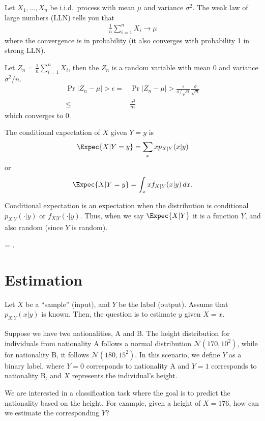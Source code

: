 \documentclass{article}
\begin{document}
\begin{remark}
    Let $X_1, \dots, X_n$ be i.i.d.~process with mean $\mu$ and variance $\sigma^2$.
    The weak law of large numbers (LLN) tells you that
    \begin{align}
        \frac{1}{n}\sum_{i=1}^n X_i \rightarrow \mu
    \end{align}
    where the convergence is in probability (it also converges with probability 1 in strong LLN).

    Let $Z_n = \frac{1}{n}\sum_{i=1}^n X_i$, then the $Z_n$ is a random variable with mean $0$ and variance $\sigma^2/n$.
    \begin{align}
        \Pr{|Z_n-\mu| > \epsilon} =&  \Pr{|Z_n-\mu| > \frac{\epsilon}{\sigma/\sqrt{n}} \frac{\sigma}{\sqrt{n}}} \\
        \leq& \frac{\sigma^2}{n\epsilon}
    \end{align}
    which converges to 0.
\end{remark}

\begin{definition}
    The conditional expectation of $X$ given $Y=y$ is
    \begin{align}
        \Expec{X|Y=y} = \sum_{x} x p_{X|Y}(x|y)
    \end{align}
    or
    \begin{align}
        \Expec{X|Y=y} = \int_{x} x f_{X|Y}(x|y)\, dx.
    \end{align}
\end{definition}
Conditional expectation is an expectation when the distribution is conditional $p_{X|Y}(\cdot|y)$ or $f_{X|Y}(\cdot|y)$.
Thus, when we say $\Expec{X|Y}$ it is a function $Y$, and also random (since $Y$ is random).

\begin{theorem}
     = .
\end{theorem}

\section{Estimation}
Let $X$ be a ``sample'' (input), and $Y$ be the label (output).
Assume that $p_{X|Y}(x|y)$ is known.
Then, the question is to estimate $y$ given $X=x$.

\begin{example}\label{example:estimation}
Suppose we have two nationalities, A and B.
The height distribution for individuals from nationality A follows a normal distribution $\mathcal{N}(170, 10^2)$, while for nationality B, it follows $\mathcal{N}(180, 15^2)$.
In this scenario, we define $Y$ as a binary label, where $Y=0$ corresponds to nationality A and $Y=1$ corresponds to nationality B, and $X$ represents the individual's height.

We are interested in a classification task where the goal is to predict the nationality based on the height.
For example, given a height of $X=176$, how can we estimate the corresponding $Y$?
\end{example}
\end{document}
